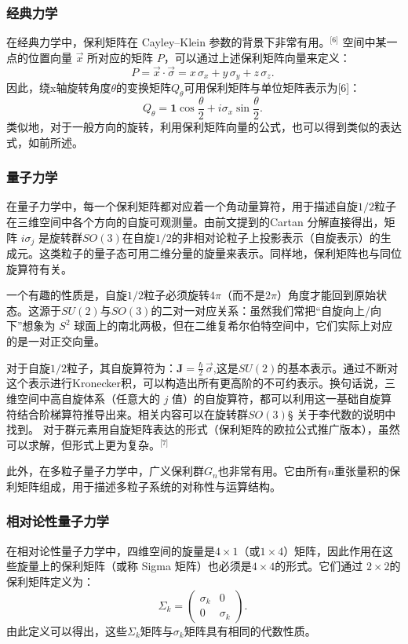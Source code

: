\subsubsection{经典力学}
在经典力学中，保利矩阵在 Cayley–Klein 参数的背景下非常有用。\(^\text{[6]}\)
空间中某一点的位置向量 $\vec{x}$ 所对应的矩阵 $P$，可以通过上述保利矩阵向量来定义：
$$
P = \vec{x} \cdot \vec{\sigma} = x\,\sigma_x + y\,\sigma_y + z\,\sigma_z.~
$$
因此，绕x轴旋转角度$\theta$的变换矩阵$Q_\theta$可用保利矩阵与单位矩阵表示为[6]：
$$
Q_{\theta} = \mathbf{1} \cos{\frac{\theta}{2}} + i \sigma_x \sin{\frac{\theta}{2}}.~
$$
类似地，对于一般方向的旋转，利用保利矩阵向量的公式，也可以得到类似的表达式，如前所述。
\subsubsection{量子力学}
在量子力学中，每一个保利矩阵都对应着一个角动量算符，用于描述自旋$1/2$粒子在三维空间中各个方向的自旋可观测量。由前文提到的Cartan 分解直接得出，矩阵 $i\sigma_j$ 是旋转群$SO(3)$在自旋$1/2$的非相对论粒子上投影表示（自旋表示）的生成元。这类粒子的量子态可用二维分量的旋量来表示。同样地，保利矩阵也与同位旋算符有关。

一个有趣的性质是，自旋$1/2$粒子必须旋转$4\pi$（而不是$2\pi$）角度才能回到原始状态。这源于$SU(2)$与$SO(3)$的二对一对应关系：虽然我们常把“自旋向上/向下”想象为 $S^2$ 球面上的南北两极，但在二维复希尔伯特空间中，它们实际上对应的是一对正交向量。

对于自旋$1/2$粒子，其自旋算符为：$\mathbf{J} = \frac{\hbar}{2} \, \vec{\sigma}$,这是$SU(2)$的基本表示。通过不断对这个表示进行Kronecker积，可以构造出所有更高阶的不可约表示。换句话说，三维空间中高自旋体系（任意大的 $j$ 值）的自旋算符，都可以利用这一基础自旋算符结合阶梯算符推导出来。相关内容可以在旋转群$SO(3)$§ 关于李代数的说明中找到。
对于群元素用自旋矩阵表达的形式（保利矩阵的欧拉公式推广版本），虽然可以求解，但形式上更为复杂。\(^\text{[7]}\)

此外，在多粒子量子力学中，广义保利群$G_n$也非常有用。它由所有$n$重张量积的保利矩阵组成，用于描述多粒子系统的对称性与运算结构。
\subsubsection{相对论性量子力学}
在相对论性量子力学中，四维空间的旋量是$4\times1$（或$1\times4$）矩阵，因此作用在这些旋量上的保利矩阵（或称 Sigma 矩阵）也必须是$4\times4$的形式。它们通过 $2\times2$的保利矩阵定义为：
$$
\Sigma_k =
\begin{pmatrix}
\sigma_k & 0 \\
0 & \sigma_k
\end{pmatrix}.~
$$
由此定义可以得出，这些$\Sigma_k$矩阵与$\sigma_k$矩阵具有相同的代数性质。

